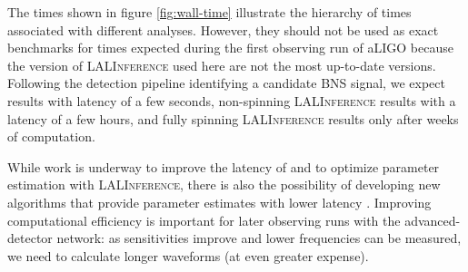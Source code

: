 The times shown in figure \ref{fig:wall-time} illustrate the hierarchy of times associated with different analyses. However, they should not be used as exact benchmarks for times expected during the first observing run of aLIGO because the version of \textsc{LALInference} used here are not the most up-to-date versions. Following the detection pipeline identifying a candidate BNS signal, we expect  results with latency of a few seconds, non-spinning \textsc{LALInference} results with a latency of a few hours, and fully spinning \textsc{LALInference} results only after weeks of computation. 

While work is underway to improve the latency of and to optimize parameter estimation with \textsc{LALInference}, there is also the possibility of developing new algorithms that provide parameter estimates with lower latency \citep{Pankow:2015cra}. Improving computational efficiency is important for later observing runs with the advanced-detector network: as sensitivities improve and lower frequencies can be measured, we need to calculate longer waveforms (at even greater expense).
  
  
  
  
  
